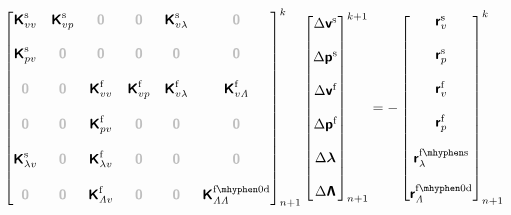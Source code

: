 \documentclass[a4paper,12pt]{report}
\newcommand{\fS}{\text{s}}
\newcommand{\fF}{\text{f}}
\newcommand{\bs}[1]{\boldsymbol{#1}}
\newcommand{\zerom}{\textcolor{lightgray}{\bs{\mathsf{0}}}}
\newcommand{\VF}{\bs{\mathsf{v}}^{\fF}}
\newcommand{\VS}{\bs{\mathsf{v}}^{\fS}}
\newcommand{\PF}{\bs{\mathsf{p}}^{\fF}}
\newcommand{\PS}{\bs{\mathsf{p}}^{\fS}}
\newcommand{\LM}{\bs{\mathsf{\lambda}}}
\newcommand{\LMZ}{\bs{\mathsf{\Lambda}}}
\newcommand{\lmi}{\lambda} %
\newcommand{\lmzi}{\mathit{\Lambda}} %
\begin{document}
\begin{align}
    \begin{bmatrix} 
    \bs{\mathsf{K}}_{vv}^{\fS} 
    & 
    \bs{\mathsf{K}}_{vp}^{\fS} 
    & \zerom 
    & \zerom 
    & 
    \bs{\mathsf{K}}_{v\lmi}^{\fS} 
    & 
    \zerom 
    \\ \\ 
    \bs{\mathsf{K}}_{pv}^{\fS} 
    & \zerom 
    & \zerom 
    & \zerom 
    & \zerom 
    & \zerom 
    \\ \\ 
    \zerom 
    & \zerom 
    & \bs{\mathsf{K}}_{vv}^{\fF} 
    & \bs{\mathsf{K}}_{vp}^{\fF} 
    & \bs{\mathsf{K}}_{v\lmi}^{\fF} 
    & \bs{\mathsf{K}}_{v\lmzi}^{\fF} 
    \\ \\ 
    \zerom 
    & \zerom 
    & \bs{\mathsf{K}}_{pv}^{\fF} 
    & \zerom 
    & \zerom 
    & \zerom
    \\ \\ 
    \bs{\mathsf{K}}_{\lmi v}^{\fS} 
    & \zerom 
    & \bs{\mathsf{K}}_{\lmi v}^{\fF} 
    & \zerom 
    & \zerom 
    & \zerom 
    \\ \\ 
    \zerom 
    & \zerom 
    & \bs{\mathsf{K}}_{\lmzi v}^{\fF} 
    & \zerom & \zerom 
    &  \bs{\mathsf{K}}_{\lmzi\lmzi}^{\mathrm{\fF\mhyphen 0d}}
    \end{bmatrix}_{n+1}^{k}
    \begin{bmatrix} 
    \Delta\VS 
    \\ \\ \Delta\PS 
    \\ \\ \Delta\VF 
    \\ \\ \Delta\PF 
    \\ \\ \Delta\LM 
    \\ \\ \Delta\LMZ 
    \end{bmatrix}_{n+1}^{k+1}
    =
    -\begin{bmatrix} 
    \bs{\mathsf{r}}_{v}^{\fS} 
    \\ \\ \bs{\mathsf{r}}_{p}^{\fS} 
    \\ \\ \bs{\mathsf{r}}_{v}^{\fF} 
    \\ \\ \bs{\mathsf{r}}_{p}^{\fF} 
    \\ \\ \bs{\mathsf{r}}_{\lmi}^{\mathrm{\fF\mhyphen\fS}}
    \\ \\ \bs{\mathsf{r}}_{\lmzi}^{\mathrm{\fF\mhyphen 0d}}
    \end{bmatrix}_{n+1}^{k}
    \label{eq:lin_sys_fsi}  
\end{align}
\end{document}
